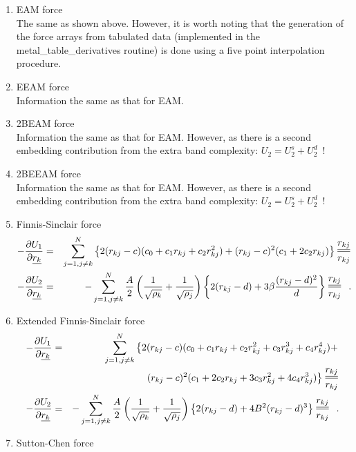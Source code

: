 \begin{enumerate}
\item EAM force \\
The same as shown above.  However, it is worth noting that the
generation of the force arrays from tabulated data (implemented
in the {\sc metal\_table\_derivatives} routine) is done using a
five point interpolation procedure.
\item EEAM force \\
Information the same as that for EAM.
\item 2BEAM force \\
Information the same as that for EAM.  However, as there is
a second embedding contribution from the extra band complexity:
$U_{2}=U^{s}_{2}+U^{d}_{2}$~!
\item 2BEEAM force \\
Information the same as that for EAM.  However, as there is
a second embedding contribution from the extra band complexity:
$U_{2}=U^{s}_{2}+U^{d}_{2}$~!
\item Finnis-Sinclair force
\begin{eqnarray}
-\frac{\partial U_{1}}{\partial \mbox{$\underline{r_{k}}$}} &=& \sum_{j=1,j \ne k}^{N} \left\{
2 (r_{kj}-c) (c_{0}+c_{1}r_{kj}+c_{2}r_{kj}^{2}) +
(r_{kj}-c)^{2} (c_{1}+2c_{2}r_{kj}) \right\} \frac{\mbox{$\underline{r_{kj}}$}}{r_{kj}} \nonumber \\
-\frac{\partial U_{2}}{\partial \mbox{$\underline{r_{k}}$}} &=& -\sum_{j=1,j \ne k}^{N}
{A \over 2} \left( {1 \over \sqrt{\rho_{k}}} + {1 \over \sqrt{\rho_{j}}} \right)
\left\{ 2(r_{kj}-d) + 3 \beta \frac{(r_{kj}-d)^{2}}{d} \right\} \frac{\mbox{$\underline{r_{kj}}$}}{r_{kj}}~~.
\end{eqnarray}
\item Extended Finnis-Sinclair force
\begin{eqnarray}
-\frac{\partial U_{1}}{\partial \mbox{$\underline{r_{k}}$}} &=& \sum_{j=1,j \ne k}^{N} \left\{
2 (r_{kj}-c) (c_{0}+c_{1}r_{kj}+c_{2}r_{kj}^{2}+c_{3}r_{kj}^{3}+c_{4}r_{kj}^{4}) + \right. \nonumber \\
& & \phantom{xxxxxxx} \left. (r_{kj}-c)^{2} (c_{1}+2c_{2}r_{kj}+3c_{3}r_{kj}^{2}+4c_{4}r_{kj}^{3}) \right\}
\frac{\mbox{$\underline{r_{kj}}$}}{r_{kj}} \\
-\frac{\partial U_{2}}{\partial \mbox{$\underline{r_{k}}$}} &=& -\sum_{j=1,j \ne k}^{N}
{A \over 2} \left( {1 \over \sqrt{\rho_{k}}} + {1 \over \sqrt{\rho_{j}}} \right)
\left\{ 2(r_{kj}-d) + 4 B^{2} (r_{kj}-d)^{3}\right\} \frac{\mbox{$\underline{r_{kj}}$}}{r_{kj}}~~. \nonumber
\end{eqnarray}
\item Sutton-Chen force

\end{enumerate}
